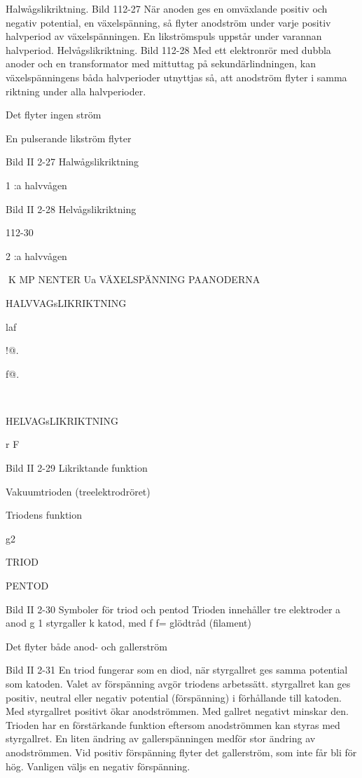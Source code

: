 Halwågslikriktning.
Bild 112-27
När anoden ges en omväxlande positiv och
negativ potential, en växelspänning, så flyter
anodström under varje positiv halvperiod av
växelspänningen. En likströmspuls uppstår
under varannan halvperiod.
Helvågslikriktning.
Bild 112-28
Med ett elektronrör med dubbla anoder och
en transformator med mittuttag på sekundärlindningen, kan växelspänningens båda
halvperioder utnyttjas så, att anodström flyter i samma riktning under alla halvperioder.

Det flyter ingen ström

En pulserande likström flyter

Bild II 2-27 Halwågslikriktning

1 :a halvvågen

Bild II 2-28 Helvågslikriktning

112-30

2 :a halvvågen

K MP NENTER
Ua
VÄXELSPÄNNING
PAANODERNA

HALVVAGsLIKRIKTNING

laf

!@.

f@.

~

HELVAGsLIKRIKTNING

r
F

Bild II 2-29 Likriktande funktion

Vakuumtrioden (treelektrodröret)

Triodens funktion

g2

TRIOD

PENTOD

Bild II 2-30 Symboler för triod och pentod
Trioden innehåller tre elektroder
a anod
g 1 styrgaller
k katod, med f f= glödtråd (filament)

Det flyter både anod- och gallerström

Bild II 2-31
En triod fungerar som en diod, när styrgallret
ges samma potential som katoden. Valet av
förspänning avgör triodens arbetssätt. styrgallret kan ges positiv, neutral eller negativ
potential (förspänning) i förhållande till katoden. Med styrgallret positivt ökar anodströmmen. Med gallret negativt minskar den.
Trioden har en förstärkande funktion eftersom anodströmmen kan styras med styrgallret. En liten ändring av gallerspänningen
medför stor ändring av anodströmmen. Vid
positiv förspänning flyter det gallerström,
som inte får bli för hög. Vanligen väljs en
negativ förspänning.

